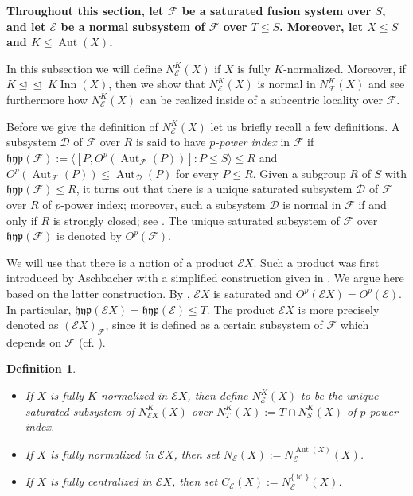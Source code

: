\documentclass[reqno,11pt]{amsart}
\numberwithin{equation}{section}
\newtheorem{definition}[equation]{Definition}
\theoremstyle{definition}
\newcommand{\F}{\mathcal{F}}
\newcommand{\E}{\mathcal{E}}
\newcommand{\mD}{\mathcal{D}}
\newcommand{\Aut}{\operatorname{Aut}}
\newcommand{\Inn}{\operatorname{Inn}}
\newcommand{\id}{\operatorname{id}}
\newcommand{\hyp}{\mathfrak{hyp}}
\def \<{\langle }
\def \>{\rangle }
\newcommand{\subn}{\unlhd\!\unlhd\;}
\begin{document}
\textbf{Throughout this section, let $\F$ be a saturated fusion system over $S$, and let $\E$ be a normal subsystem of $\F$ over $T\leq S$. Moreover, let $X\leq S$ and $K\leq \Aut(X)$.}

\smallskip

In this subsection we will define $N_\E^K(X)$ if $X$ is fully $K$-normalized. Moreover, if $K\subn K\Inn(X)$, then we show that $N_\E^K(X)$ is normal in $N_\F^K(X)$ and see furthermore how $N_\E^K(X)$ can be realized inside of a subcentric locality over $\F$. 

\smallskip

Before we give the definition of $N_\E^K(X)$ let us briefly recall a few definitions. A subsystem $\mD$ of $\F$ over $R$ is said to have \emph{$p$-power index} in $\F$ if $\hyp(\F):=\<[P,O^p(\Aut_\F(P))]\colon P\leq S\>\leq R$ and $O^p(\Aut_\F(P))\leq \Aut_{\mD}(P)$ for every $P\leq R$. Given a subgroup $R$ of $S$ with $\hyp(\F)\leq R$, it turns out that there is a unique saturated subsystem $\mD$ of $\F$ over $R$ of $p$-power index; moreover, such a subsystem $\mD$ is normal in $\F$ if and only if $R$ is strongly closed; see \cite[Theorem~I.7.4]{Aschbacher/Kessar/Oliver:2011}. The unique saturated subsystem of $\F$ over $\hyp(\F)$ is denoted by $O^p(\F)$. 

\smallskip

We will use that there is a notion of a product $\E X$. Such a product was first introduced by Aschbacher \cite[Chapter~8]{Aschbacher:2011} with a simplified construction given in \cite{Henke:2013}. We argue here based on the latter construction. By \cite[Theorem~1]{Henke:2013},  $\E X$ is saturated and $O^p(\E X)=O^p(\E)$. In particular, $\hyp(\E X)=\hyp(\E)\leq T$. The product $\E X$ is more precisely denoted as $(\E X)_\F$, since it is defined as a certain subsystem of $\F$ which depends on $\F$ (cf. \cite[Example~7.4]{Henke:2013}). 



\begin{definition}
\begin{itemize}
\item If $X$ is fully $K$-normalized in $\E X$, then define $N_\E^K(X)$ to be the unique saturated subsystem of $N_{\E X}^K(X)$ over $N_T^K(X):=T\cap N_S^K(X)$ of $p$-power index. 
\item If $X$ is fully normalized in $\E X$, then set $N_\E(X):=N_\E^{\Aut(X)}(X)$. 
\item If $X$ is fully centralized in $\E X$, then set $C_\E(X):=N_\E^{\{\id\}}(X)$. 
\end{itemize}
\end{definition}
\end{document}
